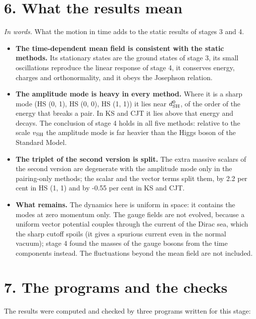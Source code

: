 \documentclass[
  10pt,
]{article}
\providecommand{\tightlist}{%
  \setlength{\itemsep}{0pt}\setlength{\parskip}{0pt}}
\begin{document}
\hypertarget{what-the-results-mean}{%
\section{6. What the results mean}\label{what-the-results-mean}}

\emph{In words.} What the motion in time adds to the static results of
stages 3 and 4.

\begin{itemize}
\tightlist
\item
  \textbf{The time-dependent mean field is consistent with the static
  methods.} Its stationary states are the ground states of stage 3, its
  small oscillations reproduce the linear response of stage 4, it
  conserves energy, charges and orthonormality, and it obeys the
  Josephson relation.
\item
  \textbf{The amplitude mode is heavy in every method.} Where it is a
  sharp mode (HS (0, 1), HS (0, 0), HS (1, 1)) it lies near
  \(d^0_{\rm SH}\), of the order of the energy that breaks a pair. In KS
  and CJT it lies above that energy and decays. The conclusion of stage
  4 holds in all five methods: relative to the scale \(v_{\rm SH}\) the
  amplitude mode is far heavier than the Higgs boson of the Standard
  Model.
\item
  \textbf{The triplet of the second version is split.} The extra massive
  scalars of the second version are degenerate with the amplitude mode
  only in the pairing-only methods; the scalar and the vector terms
  split them, by 2.2 per cent in HS (1, 1) and by -0.55 per cent in KS
  and CJT.
\item
  \textbf{What remains.} The dynamics here is uniform in space: it
  contains the modes at zero momentum only. The gauge fields are not
  evolved, because a uniform vector potential couples through the
  current of the Dirac sea, which the sharp cutoff spoils (it gives a
  spurious current even in the normal vacuum); stage 4 found the masses
  of the gauge bosons from the time components instead. The fluctuations
  beyond the mean field are not included.
\end{itemize}

\hypertarget{the-programs-and-the-checks}{%
\section{7. The programs and the
checks}\label{the-programs-and-the-checks}}

The results were computed and checked by three programs written for this
stage:
\end{document}
